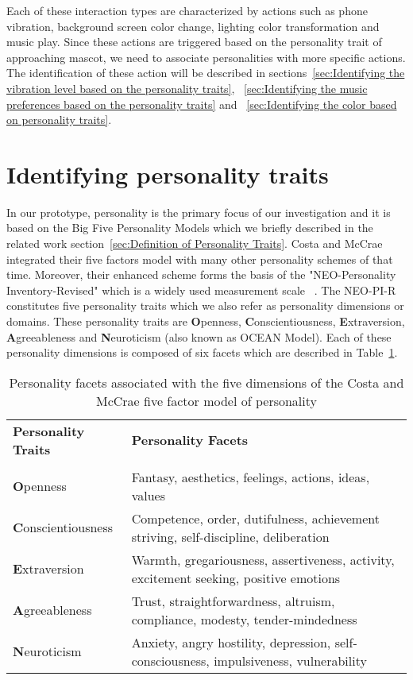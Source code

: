 Each of these interaction types are characterized by actions such as phone vibration, background screen color change, lighting color transformation and music play. Since these actions are triggered based on the personality trait of approaching mascot, we need to associate personalities with more specific actions. The identification of these action will be described in sections~\ref{sec:Identifying the vibration level based on the personality traits}, ~\ref{sec:Identifying the music preferences based on the personality traits} and ~\ref{sec:Identifying the color based on personality traits}. 

\section{Identifying personality traits}
\label{sec:Identifying personality traits}

In our prototype, personality is the primary focus of our investigation and it is based on the Big Five Personality Models which we briefly described in the related work section~\ref{sec:Definition of Personality Traits}. Costa and McCrae integrated their five factors model with many other personality schemes of that time. Moreover, their enhanced scheme forms the basis of the "NEO-Personality Inventory-Revised" which is a widely used measurement scale ~\cite{costa2008revised}. The NEO-PI-R constitutes five personality traits which we also refer as personality dimensions or domains. These personality traits are \textbf{O}penness, \textbf{C}onscientiousness, \textbf{E}xtraversion, \textbf{A}greeableness and \textbf{N}euroticism (also known as  OCEAN Model). Each of these personality dimensions is composed of six facets which are described in Table~\ref{table:personality}.

\begin{table} [h]
\centering
\begin{tabular}{ | m{8em} | m{25em}| } 
\hline
\textbf{Personality Traits} & \textbf{Personality Facets}  \\ 
\\
\hline
\textbf{O}penness & Fantasy, aesthetics, feelings, actions, ideas, values  \\
\hline 
\textbf{C}onscientiousness & Competence, order, dutifulness, achievement striving, self-discipline, deliberation  \\
\hline 
\textbf{E}xtraversion & Warmth, gregariousness, assertiveness, activity, excitement seeking, positive emotions \\
\hline 
\textbf{A}greeableness & Trust, straightforwardness, altruism, compliance, modesty, tender-mindedness  \\
\hline 
\textbf{N}euroticism & Anxiety, angry hostility, depression, self-consciousness, impulsiveness, vulnerability \\
\hline
\end{tabular}
\caption{Personality facets associated with the five dimensions of the Costa and McCrae five factor model of personality}
\label{table:personality}
\end{table}

